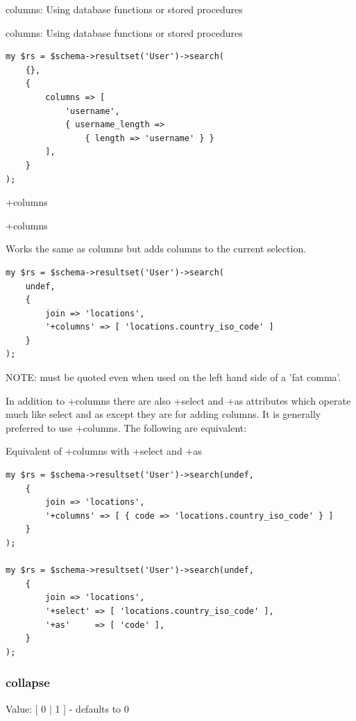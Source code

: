 columns: Using database functions or stored procedures

\begin{frame}[fragile]{columns: Using database functions or stored
    procedures}
\begin{lstlisting}
my $rs = $schema->resultset('User')->search(
    {},
    {
        columns => [
            'username',
            { username_length => 
                { length => 'username' } }
        ],
    }
);
\end{lstlisting}
\end{frame}

+columns

\begin{frame}[fragile]{+columns}

Works the same as columns but adds columns to the current selection.

\begin{lstlisting}
my $rs = $schema->resultset('User')->search(
    undef,
    {
        join => 'locations',
        '+columns' => [ 'locations.country_iso_code' ]
    }
);
\end{lstlisting}
\end{frame}

NOTE: must be quoted even when used on the left hand side of a 'fat comma'.

In addition to +columns there are also +select and +as attributes which
operate much like select and as except they are for adding columns. It is
generally preferred to use +columns. The following are equivalent:

\begin{frame}[fragile]{Equivalent of +columns with +select and +as}
\begin{lstlisting}
my $rs = $schema->resultset('User')->search(undef,
    {
        join => 'locations',
        '+columns' => [ { code => 'locations.country_iso_code' } ]
    }
);

my $rs = $schema->resultset('User')->search(undef,
    {
        join => 'locations',
        '+select' => [ 'locations.country_iso_code' ],
        '+as'     => [ 'code' ],
    }
);
\end{lstlisting}
\end{frame}

\subsubsection{collapse}

Value: [ 0 | 1 ] - defaults to 0

